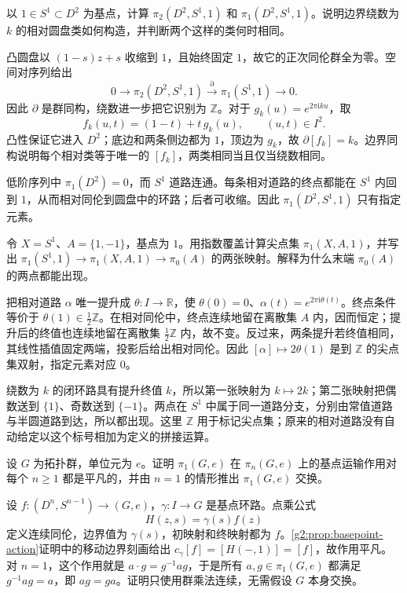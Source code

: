 \begin{exercise}\label{g2:ex:relative-disk-circle}
	以 \(1\in S^1\subset D^2\) 为基点，计算 \(\pi_2(D^2,S^1,1)\) 和 \(\pi_1(D^2,S^1,1)\)。说明边界绕数为 \(k\) 的相对圆盘类如何构造，并判断两个这样的类何时相同。
\end{exercise}
\begin{solution}
	凸圆盘以 \((1-s)z+s\) 收缩到 \(1\)，且始终固定 \(1\)，故它的正次同伦群全为零。空间对序列给出
	\[
		0\longrightarrow\pi_2(D^2,S^1,1)\xrightarrow{\partial}\pi_1(S^1,1)\longrightarrow0.
	\]
	因此 \(\partial\) 是群同构，绕数进一步把它识别为 \(\mathbb Z\)。对于 \(g_k(u)=e^{2\pi\mathrm{i}ku}\)，取
	\[
		f_k(u,t)=(1-t)+t\,g_k(u),\qquad (u,t)\in I^2.
	\]
	凸性保证它进入 \(D^2\)；底边和两条侧边都为 \(1\)，顶边为 \(g_k\)，故 \(\partial[f_k]=k\)。边界同构说明每个相对类等于唯一的 \([f_k]\)，两类相同当且仅当绕数相同。

	低阶序列中 \(\pi_1(D^2)=0\)，而 \(S^1\) 道路连通。每条相对道路的终点都能在 \(S^1\) 内回到 \(1\)，从而相对同伦到圆盘中的环路；后者可收缩。因此 \(\pi_1(D^2,S^1,1)\) 只有指定元素。
\end{solution}

\begin{exercise}\label{g2:ex:relative-circle-two-points}
	令 \(X=S^1\)、\(A=\{1,-1\}\)，基点为 \(1\)。用指数覆盖计算尖点集 \(\pi_1(X,A,1)\)，并写出 \(\pi_1(S^1,1)\to\pi_1(X,A,1)\to\pi_0(A)\) 的两张映射。解释为什么末端 \(\pi_0(A)\) 的两点都能出现。
\end{exercise}
\begin{solution}
	把相对道路 \(\alpha\) 唯一提升成 \(\theta:I\to\mathbb R\)，使 \(\theta(0)=0\)、\(\alpha(t)=e^{2\pi\mathrm{i}\theta(t)}\)。终点条件等价于 \(\theta(1)\in\frac12\mathbb Z\)。在相对同伦中，终点连续地留在离散集 \(A\) 内，因而恒定；提升后的终值也连续地留在离散集 \(\frac12\mathbb Z\) 内，故不变。反过来，两条提升若终值相同，其线性插值固定两端，投影后给出相对同伦。因此 \([\alpha]\mapsto2\theta(1)\) 是到 \(\mathbb Z\) 的尖点集双射，指定元素对应 \(0\)。

	绕数为 \(k\) 的闭环路具有提升终值 \(k\)，所以第一张映射为 \(k\mapsto2k\)；第二张映射把偶数送到 \(\{1\}\)、奇数送到 \(\{-1\}\)。两点在 \(S^1\) 中属于同一道路分支，分别由常值道路与半圆道路到达，所以都出现。这里 \(\mathbb Z\) 用于标记尖点集；原来的相对道路没有自动给定以这个标号相加为定义的拼接运算。
\end{solution}

\begin{exercise}\label{g2:ex:topological-group-simple-action}
	设 \(G\) 为拓扑群，单位元为 \(e\)。证明 \(\pi_1(G,e)\) 在 \(\pi_n(G,e)\) 上的基点运输作用对每个 \(n\ge1\) 都是平凡的，并由 \(n=1\) 的情形推出 \(\pi_1(G,e)\) 交换。
\end{exercise}
\begin{solution}
	设 \(f:(D^n,S^{n-1})\to(G,e)\)，\(\gamma:I\to G\) 是基点环路。点乘公式
	\[
		H(z,s)=\gamma(s)f(z)
	\]
	定义连续同伦，边界值为 \(\gamma(s)\)，初映射和终映射都为 \(f\)。\cref{g2:prop:basepoint-action}证明中的移动边界刻画给出 \(c_\gamma[f]=[H(-,1)]=[f]\)，故作用平凡。对 \(n=1\)，这个作用就是 \(a\cdot g=g^{-1}ag\)，于是所有 \(a,g\in\pi_1(G,e)\) 都满足 \(g^{-1}ag=a\)，即 \(ag=ga\)。证明只使用群乘法连续，无需假设 \(G\) 本身交换。
\end{solution}

